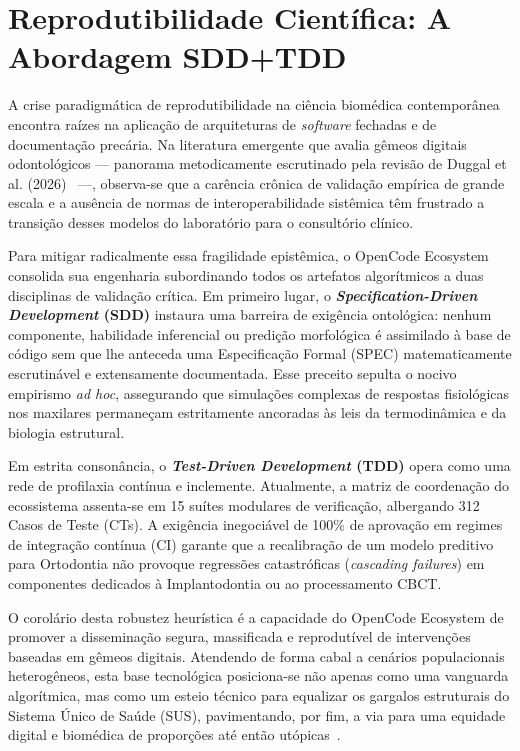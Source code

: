 \section{Reprodutibilidade Científica: A Abordagem SDD+TDD}

A crise paradigmática de reprodutibilidade na ciência biomédica contemporânea encontra raízes na aplicação de arquiteturas de \textit{software} fechadas e de documentação precária. Na literatura emergente que avalia gêmeos digitais odontológicos — panorama metodicamente escrutinado pela revisão de Duggal et al. (2026)~\cite{Duggal2026} —, observa-se que a carência crônica de validação empírica de grande escala e a ausência de normas de interoperabilidade sistêmica têm frustrado a transição desses modelos do laboratório para o consultório clínico.

Para mitigar radicalmente essa fragilidade epistêmica, o OpenCode Ecosystem consolida sua engenharia subordinando todos os artefatos algorítmicos a duas disciplinas de validação crítica. Em primeiro lugar, o \textbf{\textit{Specification-Driven Development} (SDD)} instaura uma barreira de exigência ontológica: nenhum componente, habilidade inferencial ou predição morfológica é assimilado à base de código sem que lhe anteceda uma Especificação Formal (SPEC) matematicamente escrutinável e extensamente documentada. Esse preceito sepulta o nocivo empirismo \textit{ad hoc}, assegurando que simulações complexas de respostas fisiológicas nos maxilares permaneçam estritamente ancoradas às leis da termodinâmica e da biologia estrutural.

Em estrita consonância, o \textbf{\textit{Test-Driven Development} (TDD)} opera como uma rede de profilaxia contínua e inclemente. Atualmente, a matriz de coordenação do ecossistema assenta-se em 15 suítes modulares de verificação, albergando 312 Casos de Teste (CTs). A exigência inegociável de 100\% de aprovação em regimes de integração contínua (CI) garante que a recalibração de um modelo preditivo para Ortodontia não provoque regressões catastróficas (\textit{cascading failures}) em componentes dedicados à Implantodontia ou ao processamento CBCT.


O corolário desta robustez heurística é a capacidade do OpenCode Ecosystem de promover a disseminação segura, massificada e reprodutível de intervenções baseadas em gêmeos digitais. Atendendo de forma cabal a cenários populacionais heterogêneos, esta base tecnológica posiciona-se não apenas como uma vanguarda algorítmica, mas como um esteio técnico para equalizar os gargalos estruturais do Sistema Único de Saúde (SUS), pavimentando, por fim, a via para uma equidade digital e biomédica de proporções até então utópicas~\cite{Springer2026}.
